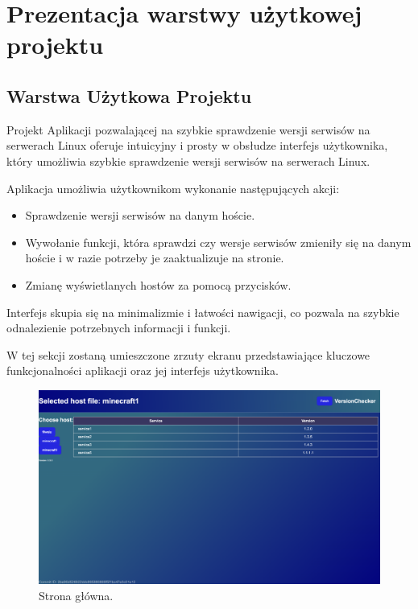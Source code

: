 \chapter{Prezentacja warstwy użytkowej projektu}

\section{Warstwa Użytkowa Projektu}

Projekt Aplikacji pozwalającej na szybkie sprawdzenie wersji serwisów na serwerach Linux oferuje intuicyjny i prosty w obsłudze interfejs użytkownika, który umożliwia szybkie sprawdzenie wersji serwisów na serwerach Linux.

Aplikacja umożliwia użytkownikom wykonanie następujących akcji:
\begin{itemize}
    \item Sprawdzenie wersji serwisów na danym hoście.
    \item Wywołanie funkcji, która sprawdzi czy wersje serwisów zmieniły się na danym hoście i w razie potrzeby je zaaktualizuje na stronie.
    \item Zmianę wyświetlanych hostów za pomocą przycisków.
\end{itemize}

Interfejs skupia się na minimalizmie i łatwości nawigacji, co pozwala na szybkie odnalezienie potrzebnych informacji i funkcji.

W tej sekcji zostaną umieszczone zrzuty ekranu przedstawiające kluczowe funkcjonalności aplikacji oraz jej interfejs użytkownika.

\begin{figure}[H]
\centering
\includegraphics[width=\textwidth]{photos/mainpage.png}
\caption{Strona główna.}
\end{figure}

